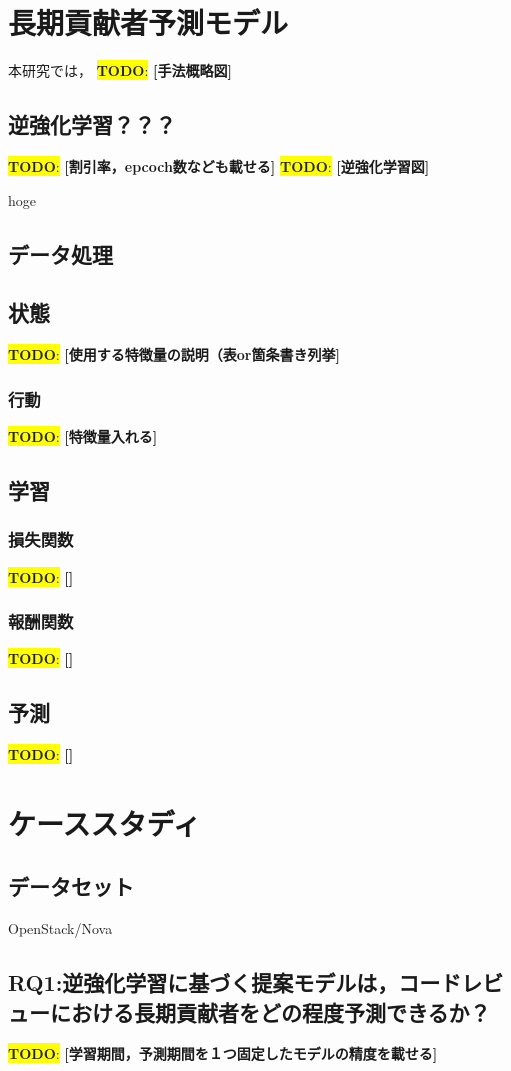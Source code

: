 \documentclass[submit,techrep,noauthor]{ipsj}
\newcommand{\todo}[1]{\colorbox{yellow}{{\bf TODO}:}{\color{red} {\textbf{[#1]}}}}
\begin{document}
\section{長期貢献者予測モデル}
本研究では，
\label{config}
\todo{手法概略図}
\subsection{逆強化学習？？？}
\todo{割引率，epcoch数なども載せる}
\todo{逆強化学習図}

hoge
\subsection{データ処理}
\subsection{状態}
\todo{使用する特徴量の説明（表or箇条書き列挙}
\subsubsection{行動}
\todo{特徴量入れる}
\subsection{学習}
\subsubsection{損失関数}
\todo{}
\subsubsection{報酬関数}
\todo{}
\subsection{予測}
\todo{}


\section{ケーススタディ}
\label{config}
\subsection{データセット}
OpenStack/Nova

\subsection{RQ1:逆強化学習に基づく提案モデルは，コードレビューにおける長期貢献者をどの程度予測できるか？}
\todo{学習期間，予測期間を１つ固定したモデルの精度を載せる}
\end{document}
